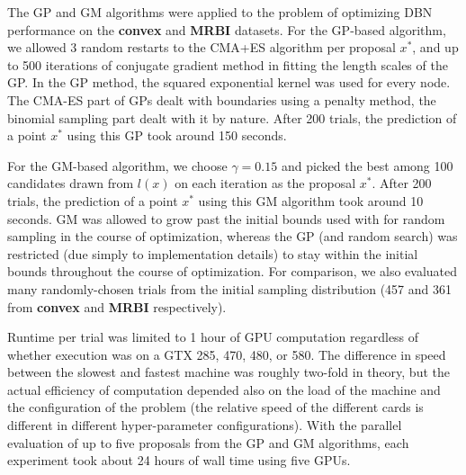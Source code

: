 \documentclass{article}
\begin{document}
The GP and GM algorithms were applied to the problem of optimizing DBN performance on the {\bf convex} and {\bf MRBI} datasets.
For the GP-based algorithm, we allowed 3 random restarts to the CMA+ES algorithm per proposal $x^*$,
and up to 500 iterations of conjugate gradient method in fitting the
length scales of the GP. In the GP method, the squared
exponential kernel \cite{RaWi06} was used for every node. The CMA-ES part of GPs
dealt with boundaries using a penalty method, the binomial sampling
part dealt with it by nature. After 200 trials, the prediction of a point $x^*$ using this GP took around 150 seconds.

For the GM-based algorithm, we choose $\gamma=0.15$ and picked the best among 100 candidates drawn from $l(x)$
on each iteration as the proposal $x^*$.  After 200 trials, the prediction of a point $x^*$ using this GM algorithm
took around 10 seconds.
GM was allowed to grow past the initial bounds used with for
random sampling in the course of optimization, whereas the GP (and random search)
was restricted (due simply to implementation details) to stay within the initial bounds
throughout the course of optimization.
For comparison, we also evaluated many randomly-chosen trials from the initial 
sampling distribution (457 and 361 from {\bf convex} and {\bf MRBI} respectively).

Runtime per trial was limited to 1 hour of GPU computation regardless of whether execution was on a GTX 285, 470, 480, or 580. The difference in speed between the slowest and fastest machine was roughly two-fold in theory, but the actual efficiency of computation depended also on the load of the machine and the configuration of the problem (the relative speed of the different cards is different in different hyper-parameter configurations).
With the parallel evaluation of up to five proposals from the GP and GM algorithms, each experiment took about 24 hours of wall time using five GPUs.
\end{document}
